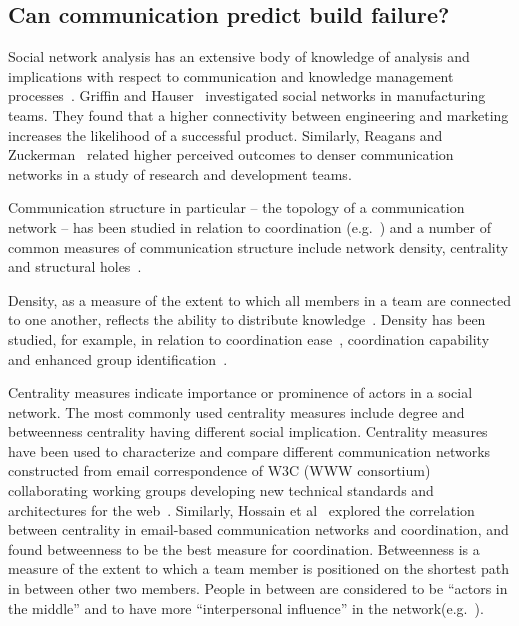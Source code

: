 \subsection{Can communication predict build failure?}
\label{sec:ResearchQuestions}
Social network analysis has an extensive body of knowledge of analysis and implications with respect to communication and knowledge management
processes~\cite{Burt:1995vo,Freeman:1979rl}. Griffin and
Hauser~\cite{Griffin:1992ms} investigated social networks in manufacturing teams.
They found that a higher connectivity between engineering and marketing increases
the likelihood of a successful product. Similarly, Reagans and
Zuckerman~\cite{RayReagans:2001os} related higher perceived outcomes to denser
communication networks in a study of research and development teams.

Communication structure in particular -- the topology of a communication network
-- has been studied in relation to coordination
(e.g.~\cite{hossain:cscw:2006,hinds:cscw:2006}) and a number of common measures of
communication structure include network density, centrality and structural
holes~\cite{Wasserman:1994sq,Freeman:1979rl}.

Density, as a measure of the extent to which all members in a team are
connected to one another, reflects the ability to distribute
knowledge~\cite{Rulke:2000ys}. Density has been studied, for example, in relation
to coordination ease~\cite{hinds:cscw:2006}, coordination
capability~\cite{hossain:cscw:2006} and enhanced group
identification~\cite{RayReagans:2001os}.

Centrality measures indicate importance or prominence of actors in a
social network. The most commonly used centrality measures include degree and
betweenness centrality having different social implication. Centrality measures
have been used to characterize and compare different communication networks
constructed from email correspondence of W3C (WWW consortium) collaborating
working groups developing new technical standards and architectures for the
web~\cite{Gloor:2003cikm}. Similarly, Hossain et al~\cite{hossain:cscw:2006}
explored the correlation between centrality in email-based communication networks
and coordination, and found betweenness to be the best measure for coordination.
Betweenness is a measure of the extent to which a team member is
positioned on the shortest path in between other two members. People in between
are considered to be ``actors in the middle'' and to have more ``interpersonal
influence'' in the
network(e.g.~\cite{Gloor:2003cikm,zimmermann:icse:2008,hossain:cscw:2006}).

